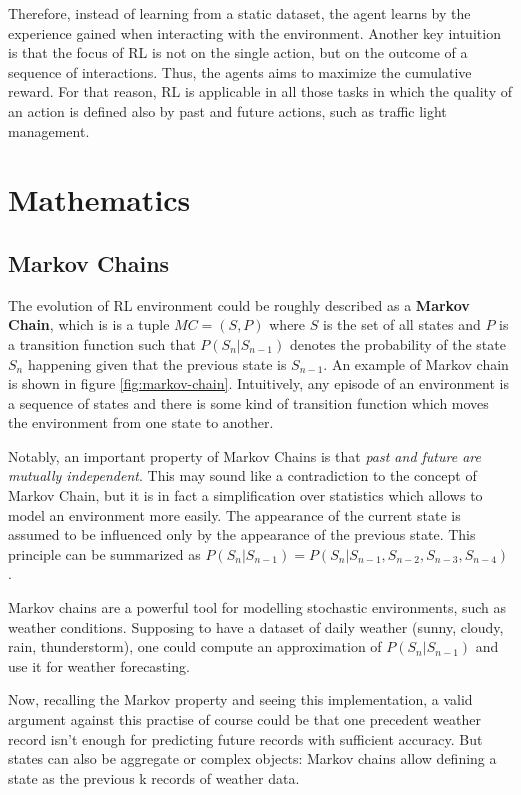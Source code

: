 Therefore, instead of learning from a static dataset, the agent learns by the experience gained when interacting with the environment.
Another key intuition is that the focus of RL is not on the single action, but on the outcome of a sequence of interactions. Thus, the agents aims to maximize the cumulative reward.
For that reason, RL is applicable in all those tasks in which the quality of an action is defined also by past and future actions, such as traffic light management.

\section{Mathematics}

\subsection{Markov Chains}

The evolution of RL environment could be roughly described as a \textbf{Markov Chain}, which is is a tuple $MC = (S, P)$ where $S$ is the set of all states and $P$ is a transition function such that $P(S_n | S_{n-1})$ denotes the probability of the state $S_n$ happening given that the previous state is $S_{n-1}$. An example of Markov chain is shown in figure \ref{fig:markov-chain}. Intuitively, any episode of an environment is a sequence of states and there is some kind of transition function which moves the environment from one state to another.

Notably, an important property of Markov Chains is that \textit{past and future are mutually independent}. This may sound like a contradiction to the concept of Markov Chain, but it is in fact a simplification over statistics which allows to model an environment more easily. The appearance of the current state is assumed to be influenced only by the appearance of the previous state. This principle can be summarized as $P(S_n | S_{n-1}) = P(S_n | S_{n-1}, S_{n-2}, S_{n-3}, S_{n-4})$.

Markov chains are a powerful tool for modelling stochastic environments, such as weather conditions. Supposing to have a dataset of daily weather (sunny, cloudy, rain, thunderstorm), one could compute an approximation of $P(S_n | S_{n-1})$ and use it for weather forecasting.

Now, recalling the Markov property and seeing this implementation, a valid argument against this practise of course could be that one precedent weather record isn't enough for predicting future records with sufficient accuracy. But states can also be aggregate or complex objects: Markov chains allow defining a state as the previous k records of weather data.

